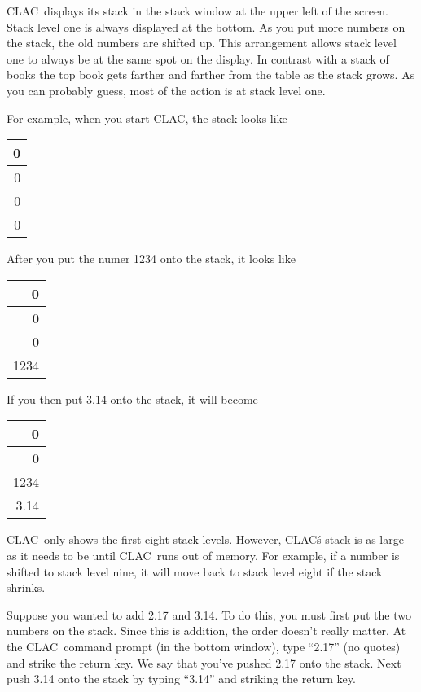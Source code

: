 \documentclass{report}
\newcommand{\CLAC}{CLAC}
\begin{document}
\CLAC\ displays its stack in the stack window at the upper left of the screen. Stack level one is always displayed at the bottom. As you put more numbers on the stack, the old numbers are shifted up. This arrangement allows stack level one to always be at the same spot on the display. In contrast with a stack of books the top book gets farther and farther from the table as the stack grows. As you can probably guess, most of the action is at stack level one.

For example, when you start \CLAC, the stack looks like

\begin{tabular}{|r|} \hline
 0 \\ \hline
 0 \\ \hline
 0 \\ \hline
 0 \\ \hline
\end{tabular}

After you put the numer 1234 onto the stack, it looks like

\begin{tabular}{|r|} \hline
    0 \\ \hline
    0 \\ \hline
    0 \\ \hline
 1234 \\ \hline
\end{tabular}

If you then put 3.14 onto the stack, it will become

\begin{tabular}{|r|} \hline
    0 \\ \hline
    0 \\ \hline
 1234 \\ \hline
 3.14 \\ \hline
\end{tabular}


\CLAC\ only shows the first eight stack levels. However, \CLAC\'s stack is as large as it needs to be until \CLAC\ runs out of memory. For example, if a number is shifted to stack level nine, it will move back to stack level eight if the stack shrinks.

Suppose you wanted to add 2.17 and 3.14. To do this, you must first put the two numbers on the stack. Since this is addition, the order doesn't really matter. At the \CLAC\ command prompt (in the bottom window), type ``2.17'' (no quotes) and strike the return key. We say that you've pushed 2.17 onto the stack. Next push 3.14 onto the stack by typing ``3.14'' and striking the return key.
\end{document}
